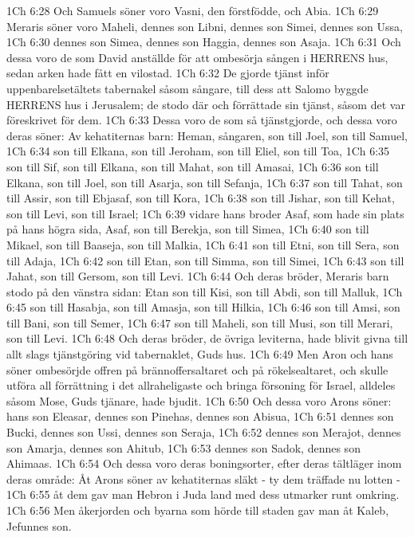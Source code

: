 1Ch 6:28  Och Samuels söner voro Vasni, den förstfödde, och Abia.
1Ch 6:29  Meraris söner voro Maheli, dennes son Libni, dennes son Simei, dennes son Ussa,
1Ch 6:30  dennes son Simea, dennes son Haggia, dennes son Asaja.
1Ch 6:31  Och dessa voro de som David anställde för att ombesörja sången i HERRENS hus, sedan arken hade fått en vilostad.
1Ch 6:32  De gjorde tjänst inför uppenbarelsetältets tabernakel såsom sångare, till dess att Salomo byggde HERRENS hus i Jerusalem; de stodo där och förrättade sin tjänst, såsom det var föreskrivet för dem.
1Ch 6:33  Dessa voro de som så tjänstgjorde, och dessa voro deras söner: Av kehatiternas barn: Heman, sångaren, son till Joel, son till Samuel,
1Ch 6:34  son till Elkana, son till Jeroham, son till Eliel, son till Toa,
1Ch 6:35  son till Sif, son till Elkana, son till Mahat, son till Amasai,
1Ch 6:36  son till Elkana, son till Joel, son till Asarja, son till Sefanja,
1Ch 6:37  son till Tahat, son till Assir, son till Ebjasaf, son till Kora,
1Ch 6:38  son till Jishar, son till Kehat, son till Levi, son till Israel;
1Ch 6:39  vidare hans broder Asaf, som hade sin plats på hans högra sida, Asaf, son till Berekja, son till Simea,
1Ch 6:40  son till Mikael, son till Baaseja, son till Malkia,
1Ch 6:41  son till Etni, son till Sera, son till Adaja,
1Ch 6:42  son till Etan, son till Simma, son till Simei,
1Ch 6:43  son till Jahat, son till Gersom, son till Levi.
1Ch 6:44  Och deras bröder, Meraris barn stodo på den vänstra sidan: Etan son till Kisi, son till Abdi, son till Malluk,
1Ch 6:45  son till Hasabja, son till Amasja, son till Hilkia,
1Ch 6:46  son till Amsi, son till Bani, son till Semer,
1Ch 6:47  son till Maheli, son till Musi, son till Merari, son till Levi.
1Ch 6:48  Och deras bröder, de övriga leviterna, hade blivit givna till allt slags tjänstgöring vid tabernaklet, Guds hus.
1Ch 6:49  Men Aron och hans söner ombesörjde offren på brännoffersaltaret och på rökelsealtaret, och skulle utföra all förrättning i det allraheligaste och bringa försoning för Israel, alldeles såsom Mose, Guds tjänare, hade bjudit.
1Ch 6:50  Och dessa voro Arons söner: hans son Eleasar, dennes son Pinehas, dennes son Abisua,
1Ch 6:51  dennes son Bucki, dennes son Ussi, dennes son Seraja,
1Ch 6:52  dennes son Merajot, dennes son Amarja, dennes son Ahitub,
1Ch 6:53  dennes son Sadok, dennes son Ahimaas.
1Ch 6:54  Och dessa voro deras boningsorter, efter deras tältläger inom deras område: Åt Arons söner av kehatiternas släkt - ty dem träffade nu lotten -
1Ch 6:55  åt dem gav man Hebron i Juda land med dess utmarker runt omkring.
1Ch 6:56  Men åkerjorden och byarna som hörde till staden gav man åt Kaleb, Jefunnes son.
